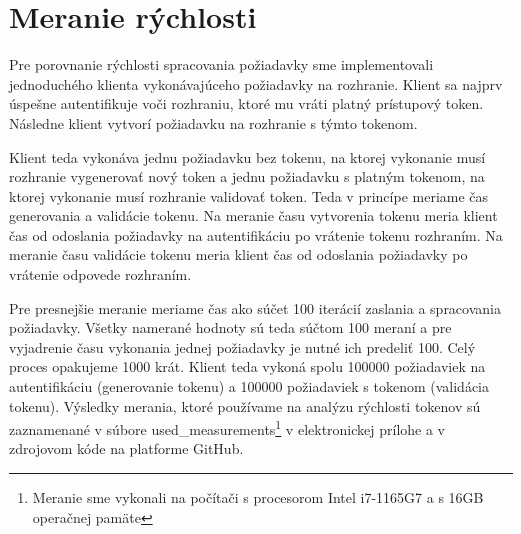 \begin{table}
  \begin{center}
    \caption{Jednoduchosť práce s knižnicami}
    \label{tab:api_porovnanie} %

  \end{center}
\end{table}

\section{Meranie rýchlosti}

Pre porovnanie rýchlosti spracovania požiadavky sme implementovali jednoduchého klienta vykonávajúceho požiadavky na rozhranie. Klient sa najprv úspešne autentifikuje voči rozhraniu, ktoré mu vráti platný prístupový token. Následne klient vytvorí požiadavku na rozhranie s týmto tokenom.

Klient teda vykonáva jednu požiadavku bez tokenu, na ktorej vykonanie musí rozhranie vygenerovať nový token a jednu požiadavku s platným tokenom, na ktorej vykonanie musí rozhranie validovať token. Teda v princípe meriame čas generovania a validácie tokenu. Na meranie času vytvorenia tokenu meria klient čas od odoslania požiadavky na autentifikáciu po vrátenie tokenu rozhraním. Na meranie času validácie tokenu meria klient čas od odoslania požiadavky po vrátenie odpovede rozhraním.

Pre presnejšie meranie meriame čas ako súčet 100 iterácií zaslania a spracovania požiadavky. Všetky namerané hodnoty sú teda súčtom 100 meraní a pre vyjadrenie času vykonania jednej požiadavky je nutné ich predeliť 100. Celý proces opakujeme 1000 krát. Klient teda vykoná spolu 100000 požiadaviek na autentifikáciu (generovanie tokenu) a 100000 požiadaviek s tokenom (validácia tokenu). Výsledky merania, ktoré používame na analýzu rýchlosti tokenov sú zaznamenané v súbore used\_measurements\footnote{Meranie sme vykonali na počítači s procesorom Intel i7-1165G7 a s 16GB operačnej pamäte} v elektronickej prílohe a v zdrojovom kóde na platforme GitHub.

